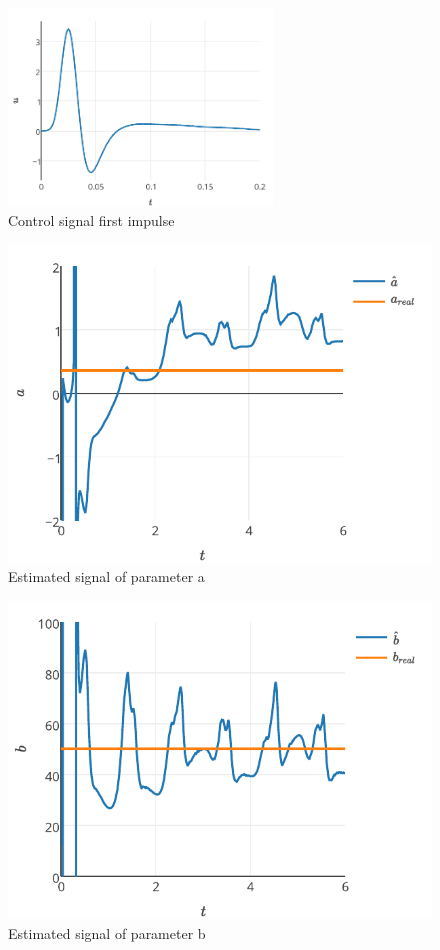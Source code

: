 \documentclass[journal]{IEEEtran}
\begin{document}
\begin{figure}[!t]
    \centering
    \includegraphics[width=7cm]{controlimpulse}
    \caption{Control signal first impulse}
    \label{fig_controlimpulse}
\end{figure}

\begin{figure}[!t]
    \centering
    \includegraphics[width=\textwidth]{parametroa}
    \caption{Estimated signal of parameter a}
    \label{fig_parametroa}
\end{figure}

\begin{figure}[!t]
    \centering
    \includegraphics[width=\textwidth]{parametrob}
    \caption{Estimated signal of parameter b}
    \label{fig_parametrob}
\end{figure}
\end{document}
